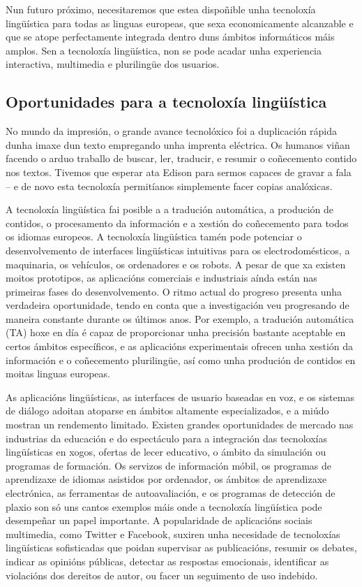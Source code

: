 \begin{multicols}{2}
Nun futuro próximo, necesitaremos que estea dispoñible unha tecnoloxía lingüística para todas as linguas europeas, que sexa economicamente alcanzable e que se atope perfectamente integrada dentro duns ámbitos informáticos máis amplos. Sen a tecnoloxía lingüística, non se pode acadar unha experiencia interactiva, multimedia e plurilingüe dos usuarios. 

\subsection{Oportunidades para a tecnoloxía lingüística}

No mundo da impresión, o grande avance tecnolóxico foi a duplicación rápida dunha imaxe dun texto empregando unha imprenta eléctrica. Os  humanos viñan facendo  o arduo traballo de buscar, ler, traducir, e resumir o coñecemento contido nos textos. Tivemos que esperar ata Edison para sermos capaces  de gravar a fala -- e de novo esta tecnoloxía permitíanos simplemente facer copias analóxicas.

    A tecnoloxía lingüística fai posible a a tradución automática, a produción de contidos, o procesamento da información e a xestión do coñecemento para todos os idiomas europeos. A tecnoloxía lingüística tamén pode potenciar o desenvolvemento de interfaces lingüísticas intuitivas para os electrodomésticos, a maquinaria, os vehículos, os ordenadores e os robots. A pesar de que xa existen moitos prototipos, as aplicacións comerciais e industriais aínda están nas primeiras fases do desenvolvemento. O ritmo actual do progreso presenta unha verdadeira oportunidade, tendo en conta que a investigación veu progresando de maneira constante durante os últimos anos. Por exemplo, a tradución automática (TA) hoxe en día é capaz de proporcionar unha precisión bastante aceptable en certos ámbitos específicos, e as aplicacións experimentais ofrecen unha xestión da información e o coñecemento plurilingüe, así como unha produción de contidos en moitas linguas europeas. 

As aplicacións lingüísticas, as interfaces de usuario baseadas en voz, e os sistemas de diálogo adoitan atoparse en ámbitos altamente especializados, e a miúdo mostran un rendemento limitado. Existen grandes oportunidades de mercado nas industrias da educación e do espectáculo para a integración das tecnoloxías lingüísticas en xogos, ofertas de lecer educativo, o ámbito da simulación ou programas de formación. Os servizos de información móbil, os programas de aprendizaxe de idiomas asistidos por ordenador, os ámbitos de aprendizaxe electrónica, as ferramentas de autoavaliación, e os programas de detección de plaxio son só uns cantos exemplos máis onde a tecnoloxía lingüística pode desempeñar un papel importante. A popularidade de aplicacións sociais multimedia, como Twitter e Facebook, suxiren unha necesidade de tecnoloxías lingüísticas sofisticadas que poidan supervisar as publicacións, resumir os debates, indicar as opinións públicas, detectar as respostas emocionais, identificar as violacións dos dereitos de autor, ou facer un seguimento de uso indebido.


\end{multicols}
